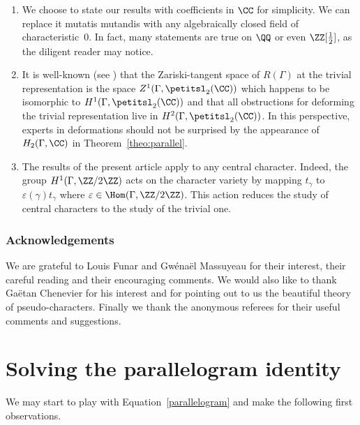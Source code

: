
\begin{enumerate}
\item
We choose to state our results with coefficients in $\CC$ for
simplicity. We can replace it mutatis mutandis with any
algebraically closed field of characteristic~0. In fact, many statements are
true on $\QQ$ or even $\ZZ[\frac{1}{2}]$, as the diligent reader may notice.

\item
It is well-known (see \eg \cite{Weil}) that the
Zariski-tangent space of $R(\Gamma)$ at the trivial representation is the
space $Z^1(\Gamma,\petitsl_2(\CC))$ which happens to be isomorphic
to $H^1(\Gamma,\petitsl_2(\CC))$ and that all obstructions for
deforming the trivial representation live in
$H^2(\Gamma, \petitsl_2(\CC))$.
In this perspective, experts in deformations should not be surprised by
the appearance of $H_2(\Gamma,\CC)$ in Theorem~\ref{theo:parallel}.

\item
The results of the present article apply to any central character.
Indeed, the group $H^1(\Gamma,\ZZ/2\ZZ)$ acts on the character variety by
mapping $t_\gamma$ to $\varepsilon(\gamma)t_\gamma$ where
$\varepsilon\in \Hom(\Gamma,\ZZ/2\ZZ)$. This action reduces the study of
central characters to the study of the trivial one.
\end{enumerate}

\subsubsection*{Acknowledgements}
We are grateful to Louis Funar and Gwénaël Massuyeau for their interest,
their careful reading and their encouraging comments. We would also like to
thank Gaëtan Chenevier for his interest and for pointing out to us the
beautiful theory of pseudo-characters.
Finally we thank the anonymous
referees for their useful comments and suggestions.

\section{Solving the parallelogram identity}

We may start to play with Equation~\eqref{parallelogram} and make the
following first observations.

